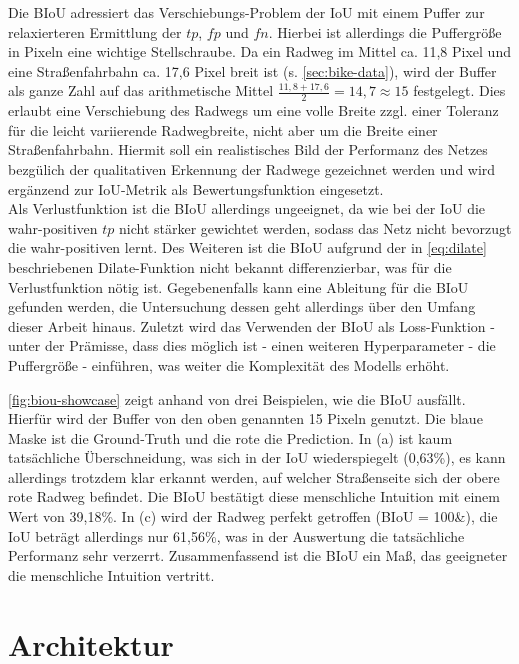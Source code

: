 Die \ac{BIoU} adressiert das Verschiebungs-Problem der \ac{IoU} mit einem Puffer zur relaxierteren Ermittlung der 
$tp$, $fp$ und $fn$. Hierbei ist allerdings die Puffergröße in Pixeln eine wichtige Stellschraube.  
Da ein Radweg im Mittel ca. 11,8 Pixel und eine Straßenfahrbahn ca. 17,6 Pixel breit ist (s. \autoref{sec:bike-data}), 
wird der Buffer als ganze Zahl auf das arithmetische Mittel $\frac{11,8 + 17,6}{2} = 14,7 \approx 15$ festgelegt. 
Dies erlaubt eine Verschiebung des Radwegs um eine volle Breite zzgl. einer Toleranz für die leicht variierende Radwegbreite, 
nicht aber um die Breite einer Straßenfahrbahn. Hiermit soll ein realistisches Bild der Performanz des Netzes 
bezgülich der qualitativen Erkennung der Radwege gezeichnet werden und wird ergänzend zur \ac{IoU}-Metrik 
als Bewertungsfunktion eingesetzt. \\
Als Verlustfunktion ist die \ac{BIoU} allerdings ungeeignet, da wie bei der \ac{IoU} die wahr-positiven $tp$ nicht 
stärker gewichtet werden, sodass das Netz nicht bevorzugt die wahr-positiven lernt. Des Weiteren ist die \ac{BIoU} aufgrund der 
in \autoref{eq:dilate} beschriebenen Dilate-Funktion nicht bekannt differenzierbar, was für die Verlustfunktion nötig ist. 
Gegebenenfalls kann eine Ableitung für die \ac{BIoU} gefunden werden, 
die Untersuchung dessen geht allerdings über den Umfang dieser Arbeit hinaus. 
Zuletzt wird das Verwenden der \ac{BIoU} als Loss-Funktion - unter der Prämisse, dass dies möglich ist - einen weiteren 
Hyperparameter - die Puffergröße - einführen, was weiter die Komplexität des Modells erhöht.  

\autoref{fig:biou-showcase} zeigt anhand von drei Beispielen, wie die BIoU ausfällt. Hierfür wird 
der Buffer von den oben genannten 15 Pixeln genutzt. 
Die blaue Maske ist die Ground-Truth und die rote die Prediction. In (a) ist kaum 
tatsächliche Überschneidung, was sich in der IoU wiederspiegelt (0,63\%), es kann allerdings trotzdem 
klar erkannt werden, auf welcher Straßenseite sich der obere rote Radweg befindet. Die BIoU 
bestätigt diese menschliche Intuition mit einem Wert von 39,18\%. In (c) wird der Radweg perfekt getroffen
(BIoU = 100\&), die IoU beträgt allerdings nur 61,56\%, was in der Auswertung die tatsächliche Performanz 
sehr verzerrt. Zusammenfassend ist die BIoU ein Maß, das geeigneter die menschliche Intuition vertritt.

\section{Architektur} \label{sec:architecture}

